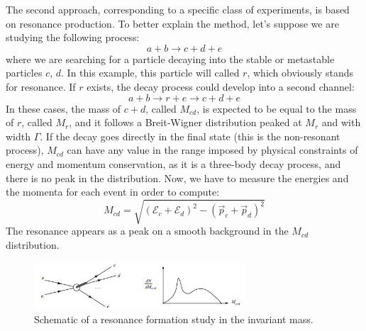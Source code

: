 The second approach, corresponding to a specific class of experiments, is based on resonance production. To better explain the method, let's suppose we are studying the following process:
\begin{equation}
	a + b \rightarrow c + d + e
\end{equation}
where we are searching for a particle decaying into the stable or metastable particles $c$, $d$. In this example, this particle will called $r$, which obviously stands for resonance. If $r$ exists, the decay process could develop into a second channel:
\begin{equation}
	a + b \rightarrow r + e \rightarrow c + d + e
\end{equation}
In these cases, the mass of $c+d$, called $M_{cd}$, is expected to be equal to the mass of $r$, called $M_{r}$, and it follows a Breit-Wigner distribution peaked at $M_{r}$ and with width $\Gamma$. If the decay goes directly in the final state (this is the non-resonant process), $M_{cd}$ can have any value in the range imposed by physical constraints of energy and momentum conservation, as it is a three-body decay process, and there is no peak in the distribution. Now, we have to measure the energies and the momenta for each event in order to compute:
\begin{equation}
	M_{cd} = \sqrt{(\mathcal{E}_{c} + \mathcal{E}_{d})^2 - (\vec{p}_{c} + \vec{p}_{d})^2}
\end{equation}
The resonance appears as a peak on a smooth background in the $M_{cd}$ distribution.

\begin{figure}[H]
	\centering
	\includegraphics[width=0.7\textwidth]{Images/LHC/invariant_mass_resonance.PNG}
	\caption{Schematic of a resonance formation study in the invariant mass.}
	\label{fig:INVARIANT_MASS_RESONANCE}
\end{figure}

